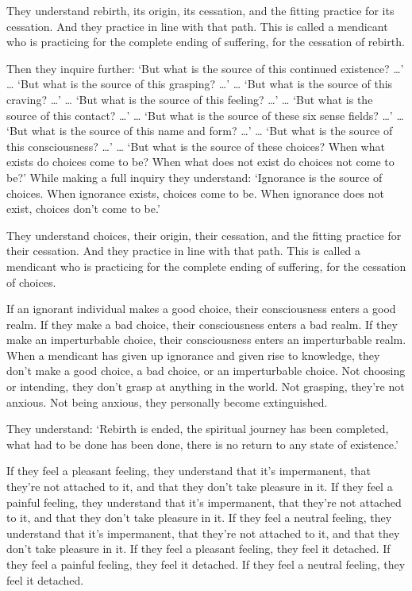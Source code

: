 \documentclass[12pt,openany]{book}%
\begin{document}
They understand rebirth, its origin, its cessation, and the fitting practice for its cessation. And they practice in line with that path. This is called a mendicant who is practicing for the complete ending of suffering, for the cessation of rebirth. 

Then they inquire further: ‘But what is the source of this continued existence? …’ … ‘But what is the source of this grasping? …’ … ‘But what is the source of this craving? …’ … ‘But what is the source of this feeling? …’ … ‘But what is the source of this contact? …’ … ‘But what is the source of these six sense fields? …’ … ‘But what is the source of this name and form? …’ … ‘But what is the source of this consciousness? …’ … ‘But what is the source of these choices? When what exists do choices come to be? When what does not exist do choices not come to be?’ While making a full inquiry they understand: ‘Ignorance is the source of choices. When ignorance exists, choices come to be. When ignorance does not exist, choices don’t come to be.’ 

They understand choices, their origin, their cessation, and the fitting practice for their cessation. And they practice in line with that path. This is called a mendicant who is practicing for the complete ending of suffering, for the cessation of choices. 

If an ignorant individual makes a good choice, their consciousness enters a good realm. If they make a bad choice, their consciousness enters a bad realm. If they make an imperturbable choice, their consciousness enters an imperturbable realm. When a mendicant has given up ignorance and given rise to knowledge, they don’t make a good choice, a bad choice, or an imperturbable choice. Not choosing or intending, they don’t grasp at anything in the world. Not grasping, they’re not anxious. Not being anxious, they personally become extinguished. 

They understand: ‘Rebirth is ended, the spiritual journey has been completed, what had to be done has been done, there is no return to any state of existence.’ 

If they feel a pleasant feeling, they understand that it’s impermanent, that they’re not attached to it, and that they don’t take pleasure in it. If they feel a painful feeling, they understand that it’s impermanent, that they’re not attached to it, and that they don’t take pleasure in it. If they feel a neutral feeling, they understand that it’s impermanent, that they’re not attached to it, and that they don’t take pleasure in it. If they feel a pleasant feeling, they feel it detached. If they feel a painful feeling, they feel it detached. If they feel a neutral feeling, they feel it detached. 
\end{document}
